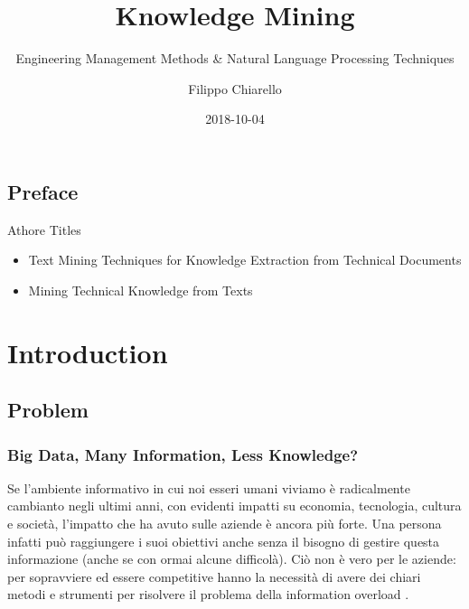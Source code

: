 \documentclass[]{book}
\title{Knowledge Mining}
\subtitle{Engineering Management Methods \& Natural Language Processing Techniques}
\author{Filippo Chiarello}
\date{2018-10-04}
\begin{document}
\maketitle

{
\setcounter{tocdepth}{1}
\tableofcontents
}
\chapter*{Preface}\label{preface}

Athore Titles

\begin{itemize}
\item
  Text Mining Techniques for Knowledge Extraction from Technical
  Documents
\item
  Mining Technical Knowledge from Texts
\end{itemize}

\part{Introduction}\label{part-introduction}

\chapter{Problem}\label{problem}

\section{Big Data, Many Information, Less
Knowledge?}\label{big-data-many-information-less-knowledge}

Se l'ambiente informativo in cui noi esseri umani viviamo è radicalmente
cambianto negli ultimi anni, con evidenti impatti su economia,
tecnologia, cultura e società, l'impatto che ha avuto sulle aziende è
ancora più forte\citep[\citet{jin2015significance},
\citet{degryse2016digitalisation}, \citet{john2014big}.
\citet{o2016weapons}]{Arun2006Firm}. Una persona infatti può raggiungere
i suoi obiettivi anche senza il bisogno di gestire questa informazione
(anche se con ormai alcune difficolà). Ciò non è vero per le aziende:
per sopravviere ed essere competitive hanno la necessità di avere dei
chiari metodi e strumenti per risolvere il problema della information
overload \citep[\citet{feng2015competing}]{levitin2014organized}.
\end{document}
